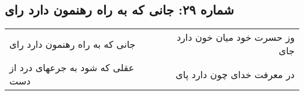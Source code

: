 \begin{center}
\section*{شماره ۲۹: جانی که به راه رهنمون دارد رای}
\label{sec:029}
\begin{longtable}{l p{0.5cm} r}
جانی که به راه رهنمون دارد رای
&&
وز حسرت خود میان خون دارد جای
\\
عقلی که شود به جرعهای درد از دست
&&
در معرفت خدای چون دارد پای
\\
\end{longtable}
\end{center}
